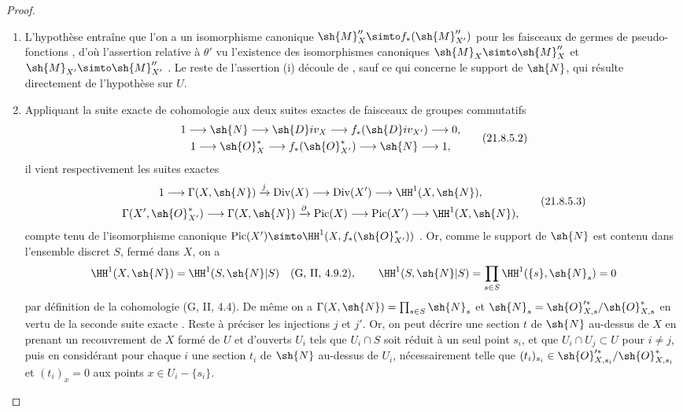 \begin{proof}
\begin{enumerate}[label=(\roman*)]
  \item L'hypothèse entraîne que l'on a un isomorphisme canonique $\sh{M}''_X\simto f_*(\sh{M}''_{X'})$ pour les faisceaux de germes de pseudo-fonctions , d'où l'assertion relative à $\theta'$ vu l'existence des isomorphismes canoniques $\sh{M}_X\simto\sh{M}''_X$ et $\sh{M}_{X'}\simto\sh{M}''_{X'}$ .
Le reste de l'assertion (i) découle de , sauf ce qui concerne le support de $\sh{N}$, qui résulte directement de l'hypothèse sur $U$.

  \item Appliquant la suite exacte de cohomologie aux deux suites exactes de faisceaux de groupes commutatifs
\[
\label{IV.21.8.5.2}
\begin{gathered}
  1\to\sh{N}\to\sh{D}iv_X\to f_*(\sh{D}iv_{X'})\to0,\\
  1\to\sh{O}^*_X\to f_*(\sh{O}^*_{X'})\to\sh{N}\to1,
\end{gathered}
  \tag{21.8.5.2}
\]
il vient respectivement les suites exactes
\[
\label{IV.21.8.5.3}
\begin{gathered}
  1\to\Gamma(X,\sh{N})\xrightarrow{j}\operatorname{Div}(X)\to\operatorname{Div}(X')\to\HH^1(X,\sh{N}),\\
  \Gamma(X',\sh{O}^*_{X'})\to\Gamma(X,\sh{N})\xrightarrow{\partial}\operatorname{Pic}(X)\to\operatorname{Pic}(X')\to\HH^1(X,\sh{N}),
\end{gathered}
  \tag{21.8.5.3}
\]
compte tenu de l'isomorphisme canonique $\operatorname{Pic}(X')\simto\HH^1(X,f_*(\sh{O}^*_{X'}))$ .
Or, comme le support de $\sh{N}$ est contenu dans l'ensemble discret $S$, fermé dans $X$, on a
\[
  \HH^1(X,\sh{N})=\HH^1(S,\sh{N}|S)\quad\text{(G, II, 4.9.2)},\qquad
  \HH^1(S,\sh{N}|S)=\prod_{s\in S}\HH^1(\{s\},\sh{N}_s)=0
\]
par définition de la cohomologie (G, II, 4.4).
De même on a $\Gamma(X,\sh{N})=\prod_{s\in S}\sh{N}_s$ et $\sh{N}_s=\sh{O}'^{*}_{X,s}/\sh{O}^*_{X,s}$ en vertu de la seconde suite exacte .
Reste à préciser les injections $j$ et $j'$.
Or, on peut décrire une section $t$ de $\sh{N}$ au-dessus de $X$ en prenant un recouvrement de $X$ formé de $U$ et d'ouverts $U_i$ tels que $U_i\cap S$ soit réduit à un seul point $s_i$, et que $U_i\cap U_j\subset U$ pour $i\neq j$, puis en considérant pour chaque $i$ une section $t_i$ de $\sh{N}$ au-dessus de $U_i$, nécessairement telle que $(t_i)_{s_i}\in\sh{O}'^{*}_{X,s_i}/\sh{O}^*_{X,s_i}$ et $(t_i)_x=0$ aux points $x\in U_i-\{s_i\}$.

\end{enumerate}
\end{proof}
